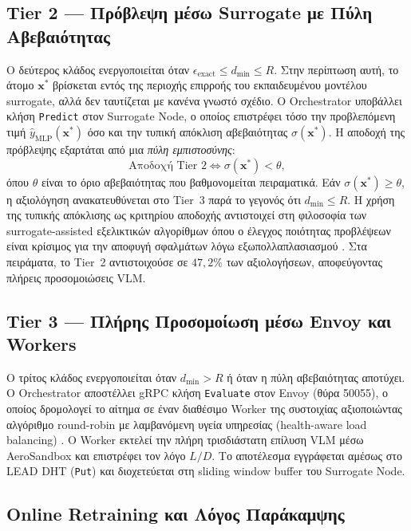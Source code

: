 \subsection*{Tier 2 — Πρόβλεψη μέσω Surrogate με Πύλη Αβεβαιότητας}

Ο δεύτερος κλάδος ενεργοποιείται όταν $\epsilon_{\text{exact}} \le d_{\min} \le R$. Στην περίπτωση αυτή, το άτομο $\bm{x}^*$ βρίσκεται εντός της περιοχής επιρροής του εκπαιδευμένου μοντέλου surrogate, αλλά δεν ταυτίζεται με κανένα γνωστό σχέδιο. Ο Orchestrator υποβάλλει κλήση \texttt{Predict} στον Surrogate Node, ο οποίος επιστρέφει τόσο την προβλεπόμενη τιμή $\hat{y}_{\text{MLP}}(\bm{x}^*)$ όσο και την τυπική απόκλιση αβεβαιότητας $\sigma(\bm{x}^*)$. Η αποδοχή της πρόβλεψης εξαρτάται από μια \emph{πύλη εμπιστοσύνης}:
\begin{equation}
\label{eq:surrogate_gate}
\text{Αποδοχή Tier 2} \iff \sigma(\bm{x}^*) < \theta,
\end{equation}
όπου $\theta$ είναι το όριο αβεβαιότητας που βαθμονομείται πειραματικά. Εάν $\sigma(\bm{x}^*) \ge \theta$, η αξιολόγηση ανακατευθύνεται στο Tier~3 παρά το γεγονός ότι $d_{\min} \le R$. Η χρήση της τυπικής απόκλισης ως κριτηρίου αποδοχής αντιστοιχεί στη φιλοσοφία των surrogate-assisted εξελικτικών αλγορίθμων όπου ο έλεγχος ποιότητας προβλέψεων είναι κρίσιμος για την αποφυγή σφαλμάτων λόγω εξωπολλαπλασιασμού \cite{jin2002framework}. Στα πειράματα, το Tier~2 αντιστοιχούσε σε $47{,}2\%$ των αξιολογήσεων, αποφεύγοντας πλήρεις προσομοιώσεις VLM.

\subsection*{Tier 3 — Πλήρης Προσομοίωση μέσω Envoy και Workers}

Ο τρίτος κλάδος ενεργοποιείται όταν $d_{\min} > R$ ή όταν η πύλη αβεβαιότητας αποτύχει. Ο Orchestrator αποστέλλει gRPC κλήση \texttt{Evaluate} στον Envoy (θύρα 50055), ο οποίος δρομολογεί το αίτημα σε έναν διαθέσιμο Worker της συστοιχίας αξιοποιώντας αλγόριθμο round-robin με λαμβανόμενη υγεία υπηρεσίας (health-aware load balancing) \cite{klein2017envoy}. Ο Worker εκτελεί την πλήρη τρισδιάστατη επίλυση VLM μέσω AeroSandbox και επιστρέφει τον λόγο $L/D$. Το αποτέλεσμα εγγράφεται αμέσως στο LEAD DHT (\texttt{Put}) και διοχετεύεται στη sliding window buffer του Surrogate Node.

\subsection*{Online Retraining και Λόγος Παράκαμψης}

